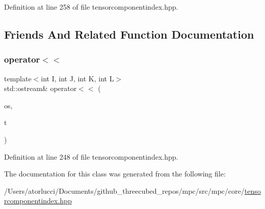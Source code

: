 Definition at line 258 of file tensorcomponentindex.\+hpp.



\subsection{Friends And Related Function Documentation}
\mbox{\label{classmpc_1_1core_1_1_c_tensor_rank4_component_index_a12a969775470a7b9aefe06565a049f8b}} 
\subsubsection{\texorpdfstring{operator$<$$<$}{operator<<}}
{\footnotesize\ttfamily template$<$int I, int J, int K, int L$>$ \\
std\+::ostream\& operator$<$$<$ (\begin{DoxyParamCaption}\item[{std\+::ostream \&}]{os,  }\item[{const \mbox{\hyperlink{classmpc_1_1core_1_1_c_tensor_rank4_component_index}{C\+Tensor\+Rank4\+Component\+Index}}$<$ I, J, K, L $>$ \&}]{t }\end{DoxyParamCaption})\hspace{0.3cm}{\ttfamily [friend]}}



Definition at line 248 of file tensorcomponentindex.\+hpp.



The documentation for this class was generated from the following file\+:\begin{DoxyCompactItemize}
\item 
/\+Users/atorlucci/\+Documents/github\+\_\+threecubed\+\_\+repos/mpc/src/mpc/core/\mbox{\hyperlink{tensorcomponentindex_8hpp}{tensorcomponentindex.\+hpp}}\end{DoxyCompactItemize}

